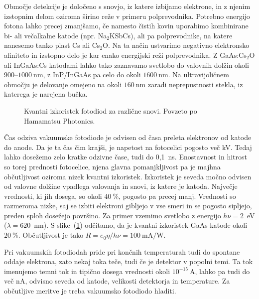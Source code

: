Območje detekcije je določeno s snovjo, iz katere izbijamo elektrone, in z njenim izstopnim delom
oziroma širino reže v primeru polprevodnika.
Potrebno energijo fotona lahko precej zmanjšamo, 
če namesto čistih kovin uporabimo kombinirane bi- ali večalkalne katode (npr. Na$_2$KSbCs),
ali pa polprevodnike, na katere nanesemo tanko plast Cs ali Cs$_2$O. Na ta način ustvarimo 
negativno elektronsko afiniteto in izstopno delo je kar enako energijski
reži polprevodnika. Z GaAs:Cs$_2$O ali InGaAs:Cs 
katodami lahko tako zaznavamo svetlobo do valovnih dolžin okoli $900$--$1000~\si{\nano\metre}$,
z InP/InGaAs pa celo do okoli $1600~\si{\nano\metre}$. Na ultravijoličnem območju je delovanje
omejeno na okoli $160~\si{\nano\metre}$ zaradi neprepustnosti stekla, iz katerega je narejena bučka.
\begin{figure}[h]
\centering
\def\svgwidth{100truemm} 

\caption{Kvantni izkoristek fotodiod za različne snovi. Povzeto po Hamamatsu Photonics.}
\label{fig:Fotodioda}
\end{figure}

Čas odziva vakuumske fotodiode je odvisen od časa preleta elektronov od katode do anode. 
Da je ta čas čim krajši, je napetost na fotocelici pogosto več kV. Tedaj lahko dosežemo 
zelo kratke odzivne čase, tudi do 0,1~ns. Enostavnost in hitrost so torej prednosti fotocelice, 
njena glavna pomanjkljivost pa je majhna občutljivost oziroma nizek kvantni izkoristek. 
Izkoristek je seveda močno odvisen od valovne dolžine vpadlega valovanja in snovi, iz 
katere je katoda. Največje vrednosti, ki jih dosega, so okoli $40~\%$, pogosto pa precej manj. 
Vrednosti so razmeroma nizke, saj se izbiti elektroni gibljejo v vse
smeri in se pogosto sipljejo, preden sploh dosežejo površino. 
Za primer vzemimo svetlobo z energijo $h\nu = 2$~eV ($\lambda=620$~nm).
S slike~(\ref{fig:Fotodioda}) odčitamo, da je kvantni izkoristek GaAs katode okoli $20~\%$. 
Občutljivost je tako $R = e_0 \eta / h\nu = 100~\si{\milli\ampere/\watt}$. 

Pri vakuumskih fotodiodah pride pri končnih temperaturah tudi do spontane oddaje elektrona, zato 
nekaj toka teče, tudi če je detektor v popolni temi. Ta tok imenujemo temni tok in tipično dosega
vrednosti okoli $10^{-15}~\si{\ampere}$, lahko pa tudi do več nA, odvisno seveda od katode, velikosti 
detektorja in temperature. Za občutljive meritve je treba vakuumsko fotodiodo hladiti. 

